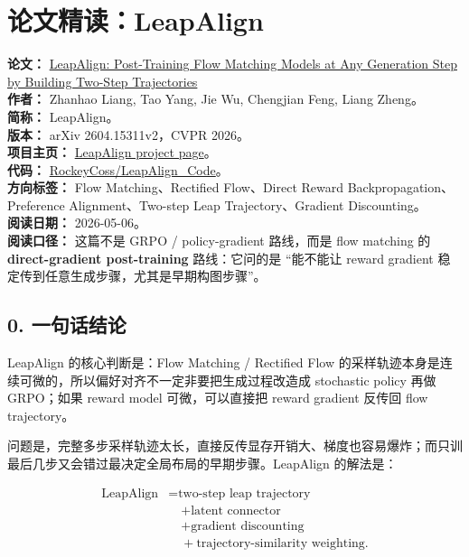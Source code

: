 
\section{论文精读：LeapAlign}

\begin{conceptbox}
\textbf{论文：} \href{https://arxiv.org/abs/2604.15311}{LeapAlign: Post-Training Flow Matching Models at Any Generation Step by Building Two-Step Trajectories}\\
\textbf{作者：} Zhanhao Liang, Tao Yang, Jie Wu, Chengjian Feng, Liang Zheng。\\
\textbf{简称：} LeapAlign。\\
\textbf{版本：} arXiv 2604.15311v2，CVPR 2026。\\
\textbf{项目主页：} \href{https://rockeycoss.github.io/leapalign/}{LeapAlign project page}。\\
\textbf{代码：} \href{https://github.com/RockeyCoss/LeapAlign_Code}{RockeyCoss/LeapAlign\_Code}。\\
\textbf{方向标签：} Flow Matching、Rectified Flow、Direct Reward Backpropagation、Preference Alignment、Two-step Leap Trajectory、Gradient Discounting。\\
\textbf{阅读日期：} 2026-05-06。\\
\textbf{阅读口径：} 这篇不是 GRPO / policy-gradient 路线，而是 flow matching 的 \textbf{direct-gradient post-training} 路线：它问的是 ``能不能让 reward gradient 稳定传到任意生成步骤，尤其是早期构图步骤''。
\end{conceptbox}

\subsection{0. 一句话结论}

LeapAlign 的核心判断是：Flow Matching / Rectified Flow 的采样轨迹本身是连续可微的，所以偏好对齐不一定非要把生成过程改造成 stochastic policy 再做 GRPO；如果 reward model 可微，可以直接把 reward gradient 反传回 flow trajectory。

问题是，完整多步采样轨迹太长，直接反传显存开销大、梯度也容易爆炸；而只训最后几步又会错过最决定全局布局的早期步骤。LeapAlign 的解法是：

\[
\begin{aligned}
\text{LeapAlign}
&= \text{two-step leap trajectory}\\
&\quad + \text{latent connector}\\
&\quad + \text{gradient discounting}\\
&\quad + \text{trajectory-similarity weighting}.
\end{aligned}
\]

